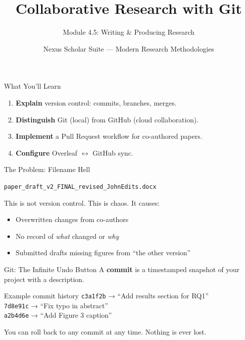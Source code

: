 \documentclass[aspectratio=169]{beamer}
\title{Collaborative Research with Git}
\subtitle{Module 4.5: Writing \& Producing Research}
\author{Nexus Scholar Suite --- Modern Research Methodologies}
\date{}
\begin{document}
\begin{frame}[plain]
  \titlepage
\end{frame}

\begin{frame}{What You'll Learn}
  \begin{enumerate}
    \item \textbf{Explain} version control: commits, branches, merges.
    \item \textbf{Distinguish} Git (local) from GitHub (cloud collaboration).
    \item \textbf{Implement} a Pull Request workflow for co-authored papers.
    \item \textbf{Configure} Overleaf $\leftrightarrow$ GitHub sync.
  \end{enumerate}
\end{frame}

\begin{frame}{The Problem: Filename Hell}
  \begin{center}
    \texttt{paper\_draft\_v2\_FINAL\_revised\_JohnEdits.docx}
  \end{center}
  \vspace{0.4cm}
  This is not version control. This is chaos. It causes:
  \begin{itemize}
    \item Overwritten changes from co-authors
    \item No record of \textit{what} changed or \textit{why}
    \item Submitted drafts missing figures from ``the other version''
  \end{itemize}
\end{frame}

\begin{frame}{Git: The Infinite Undo Button}
  A \textbf{commit} is a timestamped snapshot of your project with a description.
  \vspace{0.3cm}
  \begin{exampleblock}{Example commit history}
    \texttt{c3a1f2b} → ``Add results section for RQ1''\\
    \texttt{7d8e91c} → ``Fix typo in abstract''\\
    \texttt{a2b4d6e} → ``Add Figure 3 caption''
  \end{exampleblock}
  \vspace{0.3cm}
  You can roll back to any commit at any time. Nothing is ever lost.
\end{frame}
\end{document}
